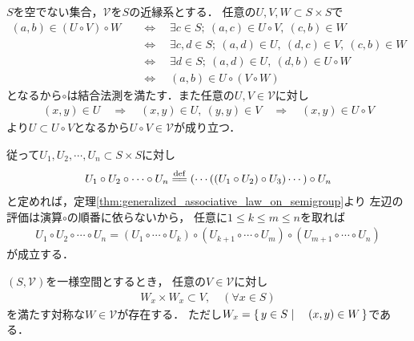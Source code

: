 	\begin{prf}
		$S$を空でない集合，$\mathscr{V}$を$S$の近縁系とする．
		任意の$U,V,W \subset S \times S$で
		\begin{align}
			(a,b) \in (U \circ V) \circ W
			&\quad \Longleftrightarrow \quad
			\exists c \in S;\ (a,c) \in U \circ V,\ (c,b) \in W \\
			&\quad \Longleftrightarrow \quad
			\exists c,d \in S;\ (a,d) \in U,\ (d,c) \in V,\ (c,b) \in W \\
			&\quad \Longleftrightarrow \quad
			\exists d \in S;\ (a,d) \in U,\ (d,b) \in U \circ W \\
			&\quad \Longleftrightarrow \quad
			(a,b) \in U \circ (V \circ W)
		\end{align}
		となるから$\circ$は結合法測を満たす．また任意の$U,V \in \mathscr{V}$に対し
		\begin{align}
			(x,y) \in U \quad \Longrightarrow \quad
			(x,y) \in U,\ (y,y) \in V \quad \Longrightarrow \quad
			(x,y) \in U \circ V
		\end{align}
		より$U \subset U \circ V$となるから$U \circ V \in \mathscr{V}$が成り立つ．
		\QED
	\end{prf}
	
	従って$U_1,U_2,\cdots,U_n \subset S \times S$に対し
	\begin{align}
		U_1 \circ U_2 \circ \cdots \circ U_n
		\defeq (\cdots((U_1 \circ U_2) \circ U_3) \cdots ) \circ U_n
	\end{align}
	と定めれば，定理\ref{thm:generalized_associative_law_on_semigroup}より
	左辺の評価は演算$\circ$の順番に依らないから，
	任意に$1 \leq k \leq m \leq n$を取れば
	\begin{align}
		U_1 \circ U_2 \circ \cdots \circ U_n
		= (U_1 \circ \cdots \circ U_k) 
		\circ (U_{k+1} \circ \cdots \circ U_m)
		\circ (U_{m+1} \circ \cdots \circ U_n)
	\end{align}
	が成立する．
	
	\begin{screen}
		\begin{thm}\label{thm:uniform_structure}
			$(S,\mathscr{V})$を一様空間とするとき，
			任意の$V \in \mathscr{V}$に対し
			\begin{align}
				W_x \times W_x \subset V,\quad (\forall x \in S)
			\end{align}
			を満たす対称な$W \in \mathscr{V}$が存在する．
			ただし$W_x = \left\{\, y \in S \mid \quad (x,y) \in W\, \right\}$である．
		\end{thm}
	\end{screen}
	
